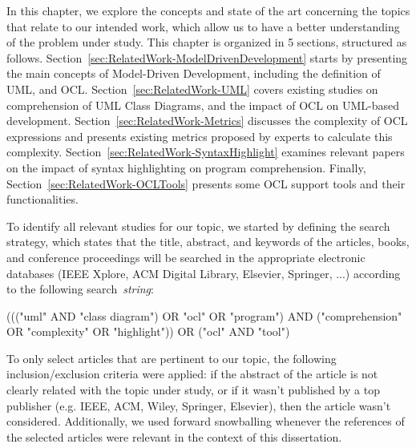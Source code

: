 {In this chapter, we explore the concepts and state of the art concerning the topics that relate to our intended work, which allow us to have a better understanding of the problem under study. This chapter is organized in 5 sections, structured as follows. Section~\ref{sec:RelatedWork-ModelDrivenDevelopment} starts by presenting the main concepts of Model-Driven Development, including the definition of UML, and OCL. Section~\ref{sec:RelatedWork-UML} covers existing studies on comprehension of UML Class Diagrams, and the impact of OCL on UML-based development. Section~\ref{sec:RelatedWork-Metrics} discusses the complexity of OCL expressions and presents existing metrics proposed by experts to calculate this complexity. Section~\ref{sec:RelatedWork-SyntaxHighlight} examines relevant papers on the impact of syntax highlighting on program comprehension. Finally, Section~\ref{sec:RelatedWork-OCLTools} presents some OCL support tools and their functionalities.}


To identify all relevant studies for our topic, we started by defining the search strategy, which states that the title, abstract, and keywords of the articles, books, and conference proceedings will be searched in the appropriate electronic databases (IEEE Xplore, ACM Digital Library, Elsevier, Springer, ...) according to the following search~\textit{string}: 

((("uml" AND "class diagram") OR "ocl" OR "program") AND ("comprehension" OR "complexity" OR "highlight")) OR ("ocl" AND "tool")

To only select articles that are pertinent to our topic, the following inclusion/exclusion criteria were applied: if the abstract of the article is not clearly related with the topic under study, or if it wasn't published by a top publisher (e.g. IEEE, ACM, Wiley, Springer, Elsevier), then the article wasn't considered. Additionally, we used forward snowballing whenever the references of the selected articles were relevant in the context of this dissertation.

